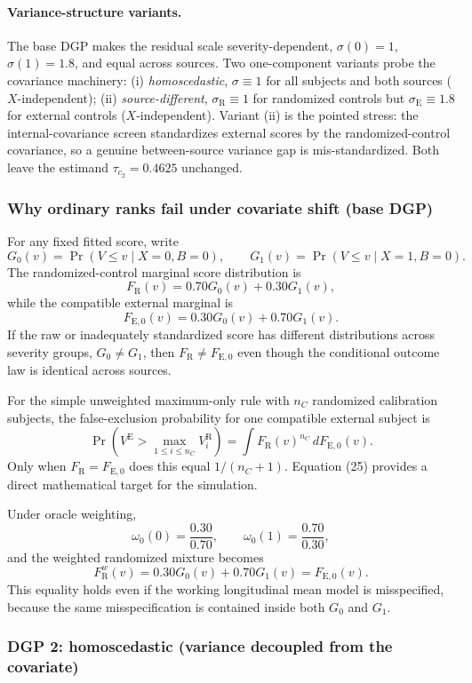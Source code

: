\documentclass[11pt]{article}
\newcommand{\R}{\mathrm{R}}
\newcommand{\E}{\mathrm{E}}
\begin{document}
\paragraph{Variance-structure variants.}
The base DGP makes the residual scale severity-dependent, $\sigma(0){=}1$, $\sigma(1){=}1.8$, and equal across sources. Two one-component variants probe the covariance machinery: (i) \emph{homoscedastic}, $\sigma{\equiv}1$ for all subjects and both sources ($X$-independent); (ii) \emph{source-different}, $\sigma_{\R}{\equiv}1$ for randomized controls but $\sigma_{\E}{\equiv}1.8$ for external controls ($X$-independent). Variant (ii) is the pointed stress: the internal-covariance screen standardizes external scores by the randomized-control covariance, so a genuine between-source variance gap is mis-standardized. Both leave the estimand $\tau_{c_2}{=}0.4625$ unchanged.

\subsubsection{Why ordinary ranks fail under covariate shift (base DGP)}

For any fixed fitted score, write
\[
G_0(v)=\Pr(V\le v\mid X=0,B=0),
\qquad
G_1(v)=\Pr(V\le v\mid X=1,B=0).
\]
The randomized-control marginal score distribution is
\[
F_{\R}(v)=0.70G_0(v)+0.30G_1(v),
\tag{23}
\]
while the compatible external marginal is
\[
F_{\E,0}(v)=0.30G_0(v)+0.70G_1(v).
\tag{24}
\]
If the raw or inadequately standardized score has different distributions across severity groups, $G_0\neq G_1$, then $F_{\R}\neq F_{\E,0}$ even though the conditional outcome law is identical across sources.

For the simple unweighted maximum-only rule with $n_C$ randomized calibration subjects, the false-exclusion probability for one compatible external subject is
\[
\Pr\left(V^{\E}>\max_{1\le i\le n_C}V_i^{\R}\right)
=
\int F_{\R}(v)^{n_C}\,dF_{\E,0}(v).
\tag{25}
\]
Only when $F_{\R}=F_{\E,0}$ does this equal $1/(n_C+1)$. Equation (25) provides a direct mathematical target for the simulation.

Under oracle weighting,
\[
\omega_0(0)=\frac{0.30}{0.70},
\qquad
\omega_0(1)=\frac{0.70}{0.30},
\tag{26}
\]
and the weighted randomized mixture becomes
\[
F_{\R}^{w}(v)
=0.30G_0(v)+0.70G_1(v)
=F_{\E,0}(v).
\tag{27}
\]
This equality holds even if the working longitudinal mean model is misspecified, because the same misspecification is contained inside both $G_0$ and $G_1$.

\subsubsection{DGP 2: homoscedastic (variance decoupled from the covariate)}
\end{document}
